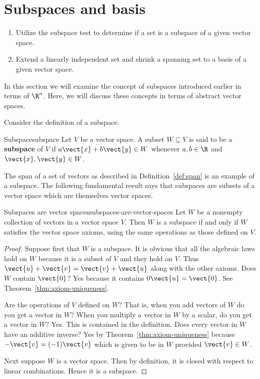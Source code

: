 \section{Subspaces and basis}

\begin{outcome}
  \begin{enumerate}
  \item Utilize the subspace test to determine if a set is a subspace
    of a given vector space.
  \item Extend a linearly independent set and shrink a spanning set to
    a basis of a given vector space.
  \end{enumerate}
\end{outcome}

In this section we will examine the concept of subspaces introduced earlier in terms of $\R^n$. Here, we will discuss these concepts in terms of abstract vector spaces. 

Consider the definition of a subspace.

\begin{definition}{Subspace}{subspace}
Let $V$ be a vector space. A subset $W\subseteq V$ is said to be a \textbf{subspace} of $V$ if $a\vect{x}+b\vect{y}
\in W$ whenever $a,b\in \R$ and $\vect{x},\vect{y}\in W$.
\end{definition}

The span of a set of vectors as described in Definition~\ref{def:span} is an example of a subspace. The following fundamental result says that subspaces are subsets of a
vector space which are themselves vector spaces.

\begin{theorem}{Subspaces are vector spaces}{subspaces-are-vector-spaces}
Let $W$ be a nonempty collection of vectors in a vector space $V$. Then $W$
is a subspace if and only if $W$ satisfies the vector space axioms, using the same
operations as those defined on $V$.
\end{theorem}

\begin{proof}
Suppose first that $W$ is a subspace. It is obvious that
all the algebraic laws hold on $W$ because it is a subset of $V$ and they
hold on $V$. Thus $\vect{u}+\vect{v}=\vect{v}+\vect{u}$ along with the other axioms. Does $W$
contain $\vect{0}$? Yes because it contains $0\vect{u}=\vect{0}$. See
Theorem~\ref{thm:axiom-uniqueness}.

 Are the operations of $V$ defined on $W$? That is,
when you add vectors of $W$ do you get a vector in $W$? When you multiply a
vector in $W$ by a scalar, do you get a vector in $W$? Yes. This is
contained in the definition. Does every vector in $W$ have an additive
inverse? Yes by Theorem~\ref{thm:axiom-uniqueness} because $-\vect{v}=(
-1) \vect{v}$ which is given to be in $W$ provided $\vect{v}\in W$.

Next suppose $W$ is a vector space. Then by definition, it is closed with
respect to linear combinations. Hence it is a subspace. 
\end{proof}

